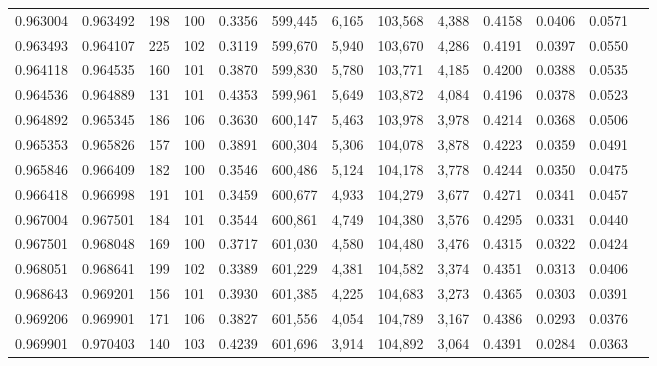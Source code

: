 \begin{tabular}{rrrrrrrrrrrrr}
0.963004 & 0.963492 &   198 & 100 &                                     0.3356 & 599,445 &   6,165 & 103,568 &   4,388 & 0.4158 & 0.0406 & 0.0571 \\
0.963493 & 0.964107 &   225 & 102 &                                     0.3119 & 599,670 &   5,940 & 103,670 &   4,286 & 0.4191 & 0.0397 & 0.0550 \\
0.964118 & 0.964535 &   160 & 101 &                                     0.3870 & 599,830 &   5,780 & 103,771 &   4,185 & 0.4200 & 0.0388 & 0.0535 \\
0.964536 & 0.964889 &   131 & 101 &                                     0.4353 & 599,961 &   5,649 & 103,872 &   4,084 & 0.4196 & 0.0378 & 0.0523 \\
0.964892 & 0.965345 &   186 & 106 &                                     0.3630 & 600,147 &   5,463 & 103,978 &   3,978 & 0.4214 & 0.0368 & 0.0506 \\
0.965353 & 0.965826 &   157 & 100 &                                     0.3891 & 600,304 &   5,306 & 104,078 &   3,878 & 0.4223 & 0.0359 & 0.0491 \\
0.965846 & 0.966409 &   182 & 100 &                                     0.3546 & 600,486 &   5,124 & 104,178 &   3,778 & 0.4244 & 0.0350 & 0.0475 \\
0.966418 & 0.966998 &   191 & 101 &                                     0.3459 & 600,677 &   4,933 & 104,279 &   3,677 & 0.4271 & 0.0341 & 0.0457 \\
0.967004 & 0.967501 &   184 & 101 &                                     0.3544 & 600,861 &   4,749 & 104,380 &   3,576 & 0.4295 & 0.0331 & 0.0440 \\
0.967501 & 0.968048 &   169 & 100 &                                     0.3717 & 601,030 &   4,580 & 104,480 &   3,476 & 0.4315 & 0.0322 & 0.0424 \\
0.968051 & 0.968641 &   199 & 102 &                                     0.3389 & 601,229 &   4,381 & 104,582 &   3,374 & 0.4351 & 0.0313 & 0.0406 \\
0.968643 & 0.969201 &   156 & 101 &                                     0.3930 & 601,385 &   4,225 & 104,683 &   3,273 & 0.4365 & 0.0303 & 0.0391 \\
0.969206 & 0.969901 &   171 & 106 &                                     0.3827 & 601,556 &   4,054 & 104,789 &   3,167 & 0.4386 & 0.0293 & 0.0376 \\
0.969901 & 0.970403 &   140 & 103 &                                     0.4239 & 601,696 &   3,914 & 104,892 &   3,064 & 0.4391 & 0.0284 & 0.0363 \\

\end{tabular}

